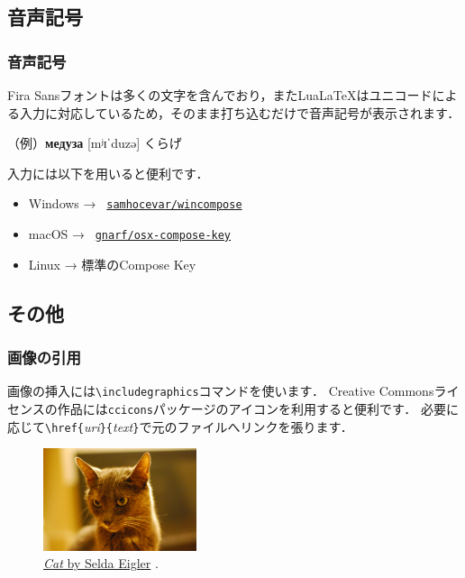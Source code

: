 \documentclass[12pt,unicode]{beamer}
\begin{document}
\subsection{音声記号}
\begin{frame}
    \frametitle{音声記号}
    Fira Sansフォントは多くの文字を含んでおり，またLua\LaTeX はユニコードによる入力に対応しているため，そのまま打ち込むだけで音声記号が表示されます．

    \smallskip

    （例）\textbf{медуза} [mʲɪˈduzə] くらげ

    \bigskip

    入力には以下を用いると便利です．
    \begin{itemize}
        \item Windows → \faGithub\ \href{https://github.com/samhocevar/wincompose}{\texttt{samhocevar/wincompose}}
        \item macOS → \faGithub\ \href{https://github.com/gnarf/osx-compose-key}{\texttt{gnarf/osx-compose-key}}
        \item Linux → 標準のCompose Key
    \end{itemize}
\end{frame}

\subsection{その他}
\begin{frame}
    \frametitle{画像の引用}
    画像の挿入には\texttt{\textbackslash includegraphics}コマンドを使います．
    Creative Commonsライセンスの作品には\texttt{ccicons}パッケージのアイコンを利用すると便利です．
    必要に応じて\texttt{\textbackslash href\{}\emph{uri}\texttt{\}\{}\emph{text}\texttt{\}}で元のファイルへリンクを張ります．

    \bigskip

    \begin{figure}[b]
        \includegraphics[width=0.4\textwidth]{cat.jpg}
        \caption{\href{https://www.flickr.com/photos/selda_eigler/8687127864/in/photolist-eeDNsC-qWFs4R-7CNDjJ-9c8DxY-eeDNhC-UCZ63T-dJNGUc-e5Nk39-988EVA-kUgwo-owDcVP-jQGjjt-5zkGTy-7WRCUo-b91XbZ-Mj8Ku-5pzwSA-9Bct2H-7CNHMY-7CJJMB-8MyEYn-9x45Mp-7JTq8M-ZrpGJ9-8fRht4-4SxVZT-5pzwjJ-ZsPJjL-aE44GL-dF6uWD-kqbHgM-5F373J-ZsQrVG-qyD7E9-ajyDPL-4WDvTp-KbDSc-5kCxD9-4MdeUo-pgDQcG-pPWrXD-662AFD-oTnC8k-apYceQ-nJSaaY-7CJLZv-7CJJMn-7CNFsU-XNMWkw-ccdtT9}{\emph{Cat} by Selda Eigler} \ccby.}
    \end{figure}

\end{frame}
\end{document}
